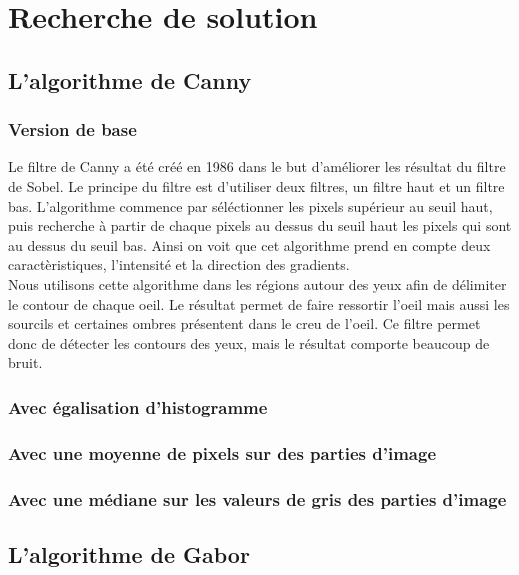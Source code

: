 \section{Recherche de solution}

\subsection{L'algorithme de Canny}

\subsubsection{Version de base}
Le filtre de Canny a été créé en 1986 dans le but d'améliorer les résultat du filtre de Sobel.
Le principe du filtre est d'utiliser deux filtres, un filtre haut et un filtre bas. L'algorithme
commence par séléctionner les pixels supérieur au seuil haut, puis recherche à partir de chaque
pixels au dessus du seuil haut les pixels qui sont au dessus du seuil bas. Ainsi on voit 
que cet algorithme prend en compte deux caractèristiques, l'intensité et la direction des 
gradients.\\

Nous utilisons cette algorithme dans les régions autour des yeux afin de délimiter le contour
de chaque oeil. Le résultat permet de faire ressortir l'oeil mais aussi les sourcils et certaines
ombres présentent dans le creu de l'oeil. Ce filtre permet donc de détecter les contours des yeux,
mais le résultat comporte beaucoup de bruit. 

\subsubsection{Avec égalisation d'histogramme}

\subsubsection{Avec une moyenne de pixels sur des parties d'image}

\subsubsection{Avec une médiane sur les valeurs de gris des parties d'image}

\subsection{L'algorithme de Gabor}